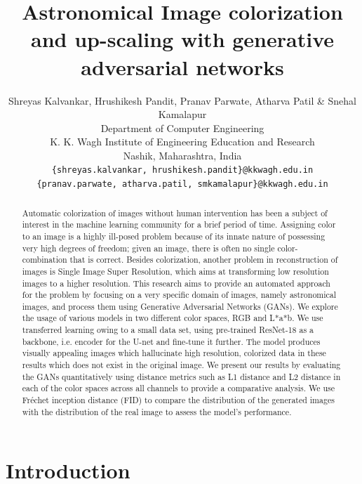 \documentclass{article} %
\title{Astronomical Image colorization and up-scaling with generative adversarial networks}
\author{Shreyas Kalvankar, Hrushikesh Pandit, Pranav Parwate, Atharva Patil \& Snehal Kamalapur \\
Department of Computer Engineering\\
K. K. Wagh Institute of Engineering Education and Research\\
Nashik, Maharashtra, India \\
\texttt{\{shreyas.kalvankar, hrushikesh.pandit\}@kkwagh.edu.in} \\
\texttt{\{pranav.parwate, atharva.patil, smkamalapur\}@kkwagh.edu.in} \\
}
\begin{document}
\usetikzlibrary{chains, calc,fit}

\maketitle

\begin{abstract}
Automatic colorization of images without human intervention has been a subject of interest in the machine learning community for a brief period of time. Assigning color to an image is a highly ill-posed problem because of its innate nature of possessing very high degrees of freedom; given an image, there is often no single color-combination that is correct. Besides colorization, another problem in reconstruction of images is Single Image Super Resolution, which aims at transforming low resolution images to a higher resolution. This research aims to provide an automated approach for the problem by focusing on a very specific domain of images, namely astronomical images, and process them using Generative Adversarial Networks (GANs). We explore the usage of various models in two different color spaces, RGB and L*a*b. We use transferred learning owing to a small data set, using pre-trained ResNet-18 as a backbone, i.e. encoder for the U-net and fine-tune it further. The model produces visually appealing images which hallucinate high resolution, colorized data in these results which does not exist in the original image. We present our results by evaluating the GANs quantitatively using distance metrics such as L1 distance and L2 distance in each of the color spaces across all channels to provide a comparative analysis. We use Fréchet inception distance (FID) to compare the distribution of the generated images with the distribution of the real image to assess the model's performance.
\end{abstract}

\section{Introduction}
\end{document}
